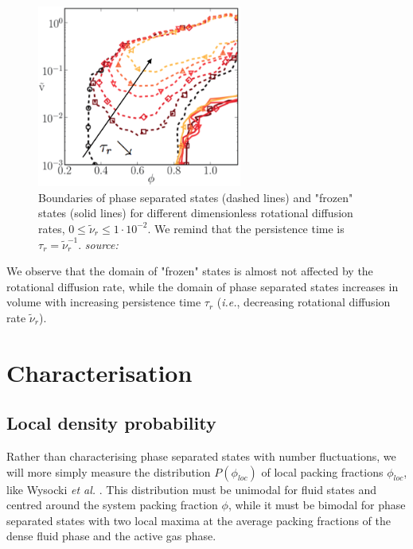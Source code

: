 \documentclass[class=report, float=false, crop=false]{standalone}
\begin{document}
\begin{figure}[h!]
\centering
\includegraphics[width=0.6\textwidth]{figures/images/phase_boundary.png}
\caption{Boundaries of phase separated states (dashed lines) and "frozen" states (solid lines) for different dimensionless rotational diffusion rates, $0 \leq \tilde{\nu}_r \leq 1\cdot10^{-2}$. We remind that the persistence time is $\tau_r = \tilde{\nu}_r^{-1}$. \textit{source:} \cite{fily2014freezing}}
\label{phase_boundary}
\end{figure}

We observe that the domain of "frozen" states is almost not affected by the rotational diffusion rate, while the domain of phase separated states increases in volume with increasing persistence time $\tau_r$ (\textit{i.e.}, decreasing rotational diffusion rate $\tilde{\nu}_r$).

\section{Characterisation}
\label{mips_characterisation}

\subsection{Local density probability}
\label{subsection:local_density_probability}

Rather than characterising phase separated states with number fluctuations, we will more simply measure the distribution $P(\phi_{loc})$ of local packing fractions $\phi_{loc}$, like Wysocki \textit{et al.} \cite{wysocki2014cooperative}. This distribution must be unimodal for fluid states and centred around the system packing fraction $\phi$, while it must be bimodal for phase separated states with two local maxima at the average packing fractions of the dense fluid phase and the active gas phase.\\
\end{document}
